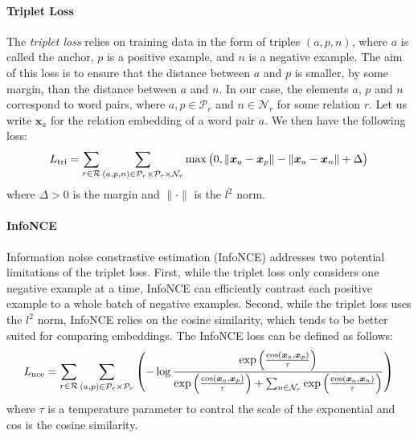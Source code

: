 \documentclass[3p]{elsarticle}
\begin{document}
{\paragraph{Triplet Loss}
The \emph{triplet loss} \cite{schroff2015facenet} relies on training data in the form of triples $(a,p,n)$, where $a$ is called the anchor, $p$ is a positive example, and $n$ is a negative example. The aim of this loss is to ensure that the distance between $a$ and $p$ is smaller, by some margin, than the distance between $a$ and $n$. In our case, the elements $a$, $p$ and $n$ correspond to word pairs, where $a,p\in \mathcal{P}_r$ and $n\in \mathcal{N}_r$ for some relation $r$. Let us write $\bm{x}_a$ for the relation embedding of a word pair $a$. We then have the following loss:
\begin{align}
    L_{{\rm tri}} = \sum_{r\in \mathcal{R}} \sum_{(a,p,n)\in \mathcal{P}_r\times \mathcal{P}_r \times \mathcal{N}_r} \max\big(0, \|\bm{x}_a-\bm{x}_p\| - \|\bm{x}_a - \bm{x}_n\| + \Delta \big)
\end{align}
where $\Delta>0$ is the margin and $\|\cdot\|$ is the $l^2$ norm.


\paragraph{InfoNCE}
Information noise constrastive estimation (InfoNCE) \cite{oord2018representation} addresses two potential limitations of the triplet loss. First, while the triplet loss only considers one negative example at a time, InfoNCE can efficiently contrast each positive example to a whole batch of negative examples. Second, while the triplet loss uses the $l^2$ norm, InfoNCE relies on the cosine similarity, which tends to be better suited for comparing embeddings. The InfoNCE loss can be defined as follows:
\begin{align}
    L_{{\rm nce}} = \sum_{r\in\mathcal{R}} \sum_{(a, p)\in \mathcal{P}_r \times \mathcal{P}_r}  \left(
    - \log \frac{
         \exp{\left( \frac{{\rm cos}(\bm{x}_a, \bm{x}_p)}{\tau} \right)}
        }{\exp{\left( \frac{{\rm cos}(\bm{x}_a, \bm{x}_p)}{\tau} \right)} + \sum_{n \in \mathcal{N}_r} \exp{\left(\frac{{\rm cos}(\bm{x}_a, \bm{x}_n)}{\tau} \right)} 
        }
    \right)
\end{align}
where $\tau$ is a temperature parameter to control the scale of the exponential and cos is the cosine similarity.

}
\end{document}
